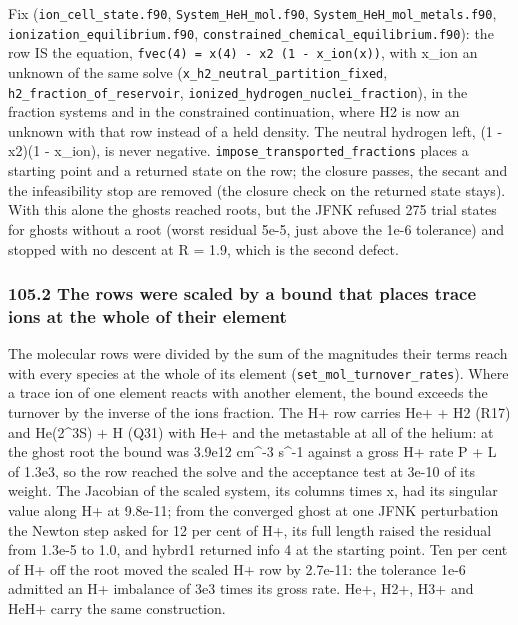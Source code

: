\documentclass[english,a4paper]{my_memo}
\begin{document}
Fix (\texttt{ion\_cell\_state.f90}, \texttt{System\_HeH\_mol.f90}, \texttt{System\_HeH\_mol\_metals.f90},
\texttt{ionization\_equilibrium.f90}, \texttt{constrained\_chemical\_equilibrium.f90}): the
row IS the equation, \texttt{fvec(4)\ =\ x(4)\ -\ x2\ (1\ -\ x\_ion(x))}, with x\_ion an
unknown of the same solve (\texttt{x\_h2\_neutral\_partition\_fixed},
\texttt{h2\_fraction\_of\_reservoir}, \texttt{ionized\_hydrogen\_nuclei\_fraction}), in the
fraction systems and in the constrained continuation, where H2 is now an
unknown with that row instead of a held density. The neutral hydrogen left,
(1 - x2)(1 - x\_ion), is never negative. \texttt{impose\_transported\_fractions}
places a starting point and a returned state on the row; the closure passes,
the secant and the infeasibility stop are removed (the closure check on the
returned state stays). With this alone the ghosts reached roots, but the
JFNK refused 275 trial states for ghosts without a root (worst residual
5e-5, just above the 1e-6 tolerance) and stopped with no descent at
\textbar\textbar R\textbar\textbar{} = 1.9, which is the second defect.

\subsubsection{105.2 The rows were scaled by a bound that places trace ions at the whole of their element}\label{1052-the-rows-were-scaled-by-a-bound-that-places-trace-ions-at-the-whole-of-their-element}

The molecular rows were divided by the sum of the magnitudes their terms
reach with every species at the whole of its element (\texttt{set\_mol\_turnover\_rates}).
Where a trace ion of one element reacts with another element, the bound
exceeds the turnover by the inverse of the ion\textquotesingle s fraction. The H+ row carries
He+ + H2 (R17) and He(2\^{}3S) + H (Q31) with He+ and the metastable at all of
the helium: at the ghost root the bound was 3.9e12 cm\^{}-3 s\^{}-1 against a gross
H+ rate P + L of 1.3e3, so the row reached the solve and the acceptance test
at 3e-10 of its weight. The Jacobian of the scaled system, its columns times
\textbar x\textbar, had its singular value along H+ at 9.8e-11; from the converged ghost at
one JFNK perturbation the Newton step asked for 12 per cent of H+, its full
length raised the residual from 1.3e-5 to 1.0, and hybrd1 returned info 4 at
the starting point. Ten per cent of H+ off the root moved the scaled H+ row
by 2.7e-11: the tolerance 1e-6 admitted an H+ imbalance of 3e3 times its
gross rate. He+, H2+, H3+ and HeH+ carry the same construction.
\end{document}
